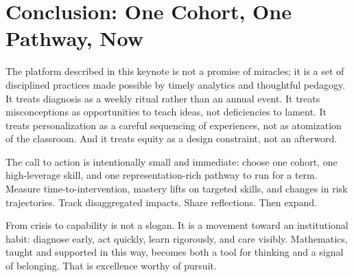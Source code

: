 \section{Conclusion: One Cohort, One Pathway, Now}

The platform described in this keynote is not a promise of miracles; it is a set of disciplined practices made possible by timely analytics and thoughtful pedagogy. It treats diagnosis as a weekly ritual rather than an annual event. It treats misconceptions as opportunities to teach ideas, not deficiencies to lament. It treats personalization as a careful sequencing of experiences, not as atomization of the classroom. And it treats equity as a design constraint, not an afterword.

The call to action is intentionally small and immediate: choose one cohort, one high-leverage skill, and one representation-rich pathway to run for a term. Measure time-to-intervention, mastery lifts on targeted skills, and changes in risk trajectories. Track disaggregated impacts. Share reflections. Then expand.

From crisis to capability is not a slogan. It is a movement toward an institutional habit: diagnose early, act quickly, learn rigorously, and care visibly. Mathematics, taught and supported in this way, becomes both a tool for thinking and a signal of belonging. That is excellence worthy of pursuit.

